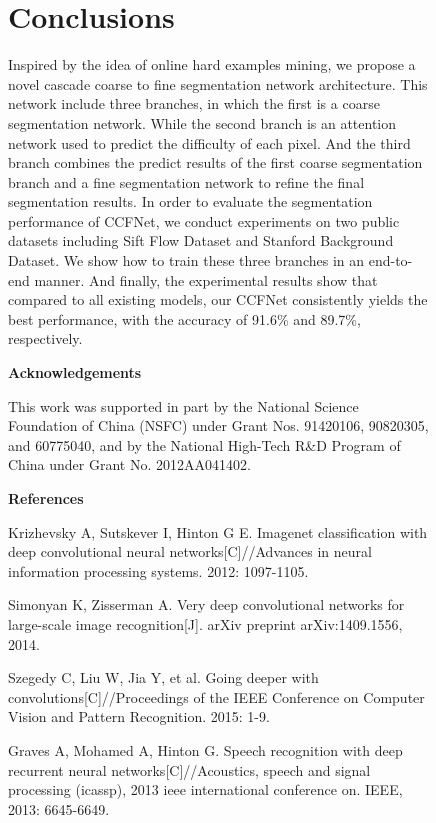 \documentclass[10.5pt,compsoc]{TsT}
\theoremstyle{mystyle}
\begin{document}
{\begin{figure}[t]
\section{Conclusions}
\noindent

Inspired by the idea of online hard examples mining, we propose a novel cascade coarse to fine segmentation network architecture.
This network include three branches, in which the first is a coarse segmentation network.
While the second branch is an attention network used to predict the difficulty of each pixel.
And the third branch combines the predict results of the first coarse segmentation branch and a fine segmentation network to refine the final segmentation results.
In order to evaluate the segmentation performance of CCFNet, we conduct experiments on two public datasets including Sift Flow Dataset and Stanford Background Dataset. 
We show how to train these three branches in an end-to-end manner. And finally, the experimental results show that compared to all existing models, our CCFNet consistently yields the best performance, with the accuracy of 91.6\% and 89.7\%, respectively.


\vskip 2mm
\noindent
\textbf{Acknowledgements}
\vskip 2mm

\noindent
This work was supported in part by the National Science Foundation of China (NSFC) under Grant Nos. 91420106, 90820305, and 60775040, and by the National High-Tech R\&D Program of China under Grant No. 2012AA041402.

\vskip 2mm
\noindent
\textbf{References}
\vskip 2mm


\begin{thebibliography}{99}
 \addtolength{\itemsep}{-1em}
\vspace {1.5mm}

Krizhevsky A, Sutskever I, Hinton G E. Imagenet classification with deep convolutional neural networks[C]//Advances in neural information processing systems. 2012: 1097-1105.

Simonyan K, Zisserman A. Very deep convolutional networks for large-scale image recognition[J]. arXiv preprint arXiv:1409.1556, 2014.

Szegedy C, Liu W, Jia Y, et al. Going deeper with convolutions[C]//Proceedings of the IEEE Conference on Computer Vision and Pattern Recognition. 2015: 1-9.

Graves A, Mohamed A, Hinton G. Speech recognition with deep recurrent neural networks[C]//Acoustics, speech and signal processing (icassp), 2013 ieee international conference on. IEEE, 2013: 6645-6649.


\end{thebibliography}
\end{figure}}
\end{document}
